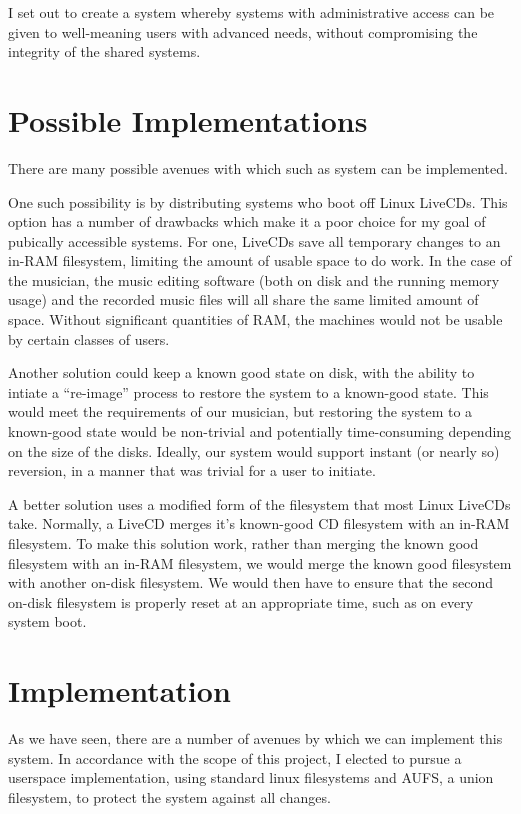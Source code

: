 \documentclass[12pt]{article}
\begin{document}
I set out to create a system whereby systems with administrative access
can be given to well-meaning users with advanced needs, without compromising
the integrity of the shared systems. 

\section{Possible Implementations}
There are many possible avenues with which such as system can be implemented.

One such possibility is by distributing systems who boot off Linux LiveCDs.
This option has a number of drawbacks which make it a poor choice for my 
goal of pubically accessible systems.  For one, LiveCDs save all temporary 
changes to an in-RAM filesystem, limiting the amount of usable space to do
work.  In the case of the musician, the music editing software (both on disk
and the running memory usage) and the recorded music files will all share the 
same limited amount of space.  Without significant quantities of RAM, the 
machines would not be usable by certain classes of users.

Another solution could keep a known good state on disk, with the ability to
intiate a ``re-image'' process to restore the system to a known-good state.
This would meet the requirements of our musician, but restoring the system
to a known-good state would be non-trivial and potentially time-consuming 
depending on the size of the disks.  Ideally, our system would support 
instant (or nearly so) reversion, in a manner that was trivial for a user
to initiate.

A better solution uses a modified form of the filesystem that most Linux 
LiveCDs take. Normally, a LiveCD merges it's known-good CD filesystem 
with an in-RAM filesystem.  To make this solution work, rather than 
merging the known good filesystem with an in-RAM filesystem, we would 
merge the known good filesystem with another on-disk filesystem.  We would
then have to ensure that the second on-disk filesystem is properly reset 
at an appropriate time, such as on every system boot.

\section{Implementation}

As we have seen, there are a number of avenues by which we can implement this 
system.  In accordance with the scope of this project, I elected to pursue
a userspace implementation, using standard linux filesystems and AUFS, a
union filesystem, to protect the system against all changes.
\end{document}
